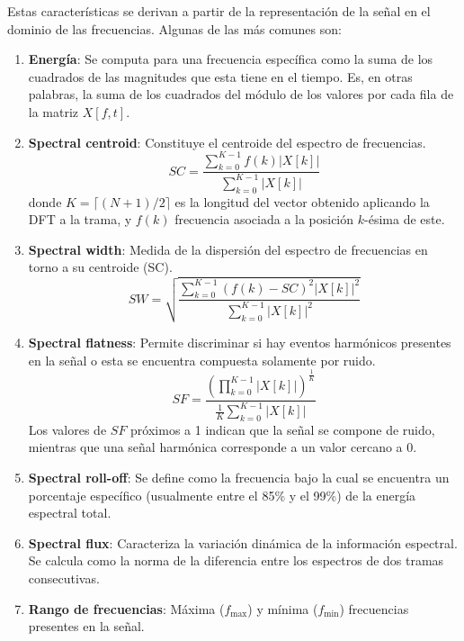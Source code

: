 Estas características se derivan a partir de la representación de la señal en el dominio de las frecuencias.
Algunas de las más comunes son:

\begin{enumerate}
    \item \textbf{Energía}: Se computa para una frecuencia específica como la suma de los cuadrados de las magnitudes que esta tiene en el tiempo.
    Es, en otras palabras, la suma de los cuadrados del módulo de los valores por cada fila de la matriz $X[f,t]$.
    \item \textbf{Spectral centroid}: Constituye el centroide del espectro de frecuencias.
    \[
        SC = \frac{\sum_{k=0}^{K-1}{f(k)|X[k]|}}{\sum_{k=0}^{K-1}{|X[k]|}}
    \]
    donde $K = \lceil (N+1)/2 \rceil$ es la longitud del vector obtenido aplicando la DFT a la trama, y $f(k)$ frecuencia asociada a la posición $k$-ésima de este.
    \item \textbf{Spectral width}: Medida de la dispersión del espectro de frecuencias en torno a su centroide (SC).
    \[
        SW = \sqrt{\frac{\sum_{k=0}^{K-1}{(f(k)-SC)^2 |X[k]|^2}}{\sum_{k=0}^{K-1}{|X[k]|^2}}}
    \]
    \item \textbf{Spectral flatness}: Permite discriminar si hay eventos harmónicos presentes en la señal o esta se encuentra compuesta solamente por ruido.
    \[
        SF = \frac{(\prod_{k=0}^{K-1}{|X[k]|})^{\frac{1}{K}}}{\frac{1}{K}\sum_{k=0}^{K-1}{|X[k]|}}
    \]
    Los valores de $SF$ próximos a 1 indican que la señal se compone de ruido, mientras que una señal harmónica corresponde a un valor cercano a 0.
    \item \textbf{Spectral roll-off}: Se define como la frecuencia bajo la cual se encuentra un porcentaje específico (usualmente entre el 85\% y el 99\%) de la energía espectral total.
    \item \textbf{Spectral flux}: Caracteriza la variación dinámica de la información espectral.
    Se calcula como la norma de la diferencia entre los espectros de dos tramas consecutivas.
    \item \textbf{Rango de frecuencias}: Máxima ($f_{\max}$) y mínima ($f_{\min}$) frecuencias presentes en la señal.
\end{enumerate}